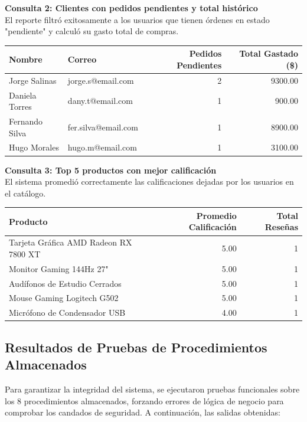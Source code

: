 \documentclass[11pt,a4paper]{article}
\begin{document}
\textbf{Consulta 2: Clientes con pedidos pendientes y total histórico} \\
El reporte filtró exitosamente a los usuarios que tienen órdenes en estado "pendiente" y calculó su gasto total de compras.
\begin{table}[H]
    \centering
    \footnotesize
    \begin{tabular}{@{}llrr@{}}
        \toprule
        \textbf{Nombre} & \textbf{Correo} & \textbf{Pedidos Pendientes} & \textbf{Total Gastado (\$)} \\
        \midrule
        Jorge Salinas & jorge.s@email.com & 2 & 9300.00 \\
        Daniela Torres & dany.t@email.com & 1 & 900.00 \\
        Fernando Silva & fer.silva@email.com & 1 & 8900.00 \\
        Hugo Morales & hugo.m@email.com & 1 & 3100.00 \\
        \bottomrule
    \end{tabular}
\end{table}

\textbf{Consulta 3: Top 5 productos con mejor calificación} \\
El sistema promedió correctamente las calificaciones dejadas por los usuarios en el catálogo.
\begin{table}[H]
    \centering
    \footnotesize
    \begin{tabular}{@{}lrr@{}}
        \toprule
        \textbf{Producto} & \textbf{Promedio Calificación} & \textbf{Total Reseñas} \\
        \midrule
        Tarjeta Gráfica AMD Radeon RX 7800 XT & 5.00 & 1 \\
        Monitor Gaming 144Hz 27" & 5.00 & 1 \\
        Audífonos de Estudio Cerrados & 5.00 & 1 \\
        Mouse Gaming Logitech G502 & 5.00 & 1 \\
        Micrófono de Condensador USB & 4.00 & 1 \\
        \bottomrule
    \end{tabular}
\end{table}

\subsection{Resultados de Pruebas de Procedimientos Almacenados}
Para garantizar la integridad del sistema, se ejecutaron pruebas funcionales sobre los 8 procedimientos almacenados, forzando errores de lógica de negocio para comprobar los candados de seguridad. A continuación, las salidas obtenidas:
\end{document}
